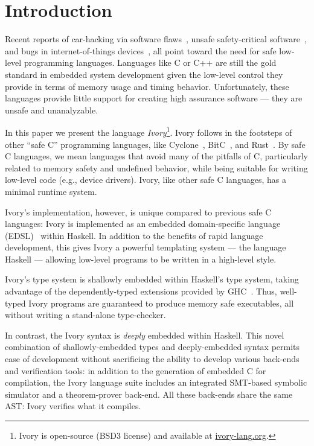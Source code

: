 \section{Introduction}
\label{sec:introduction}

Recent reports of car-hacking via software flaws~\cite{}, unsafe
safety-critical software~\cite{}, and bugs in internet-of-things
devices~\cite{}, all point toward the need for safe low-level programming
languages. Languages like C or C++ are still the gold standard in embedded
system development given the low-level control they provide in terms of memory
usage and timing behavior. Unfortunately, these languages provide
little support for creating high assurance software --- they are
unsafe and unanalyzable.

In this paper we present the language \emph{Ivory}\footnote{%
Ivory is open-source (BSD3 license) and available at \url{ivory-lang.org}.}.
Ivory follows in the
footsteps of other ``safe C'' programming languages, like
Cyclone~\cite{cyclone}, BitC~\cite{bitc}, and Rust~\cite{rust}. By safe C
languages, we mean languages that avoid many of the pitfalls of C, particularly
related to memory safety and undefined behavior, while being suitable for
writing low-level code (e.g., device drivers). Ivory, like other safe C
languages, has a minimal runtime system.

Ivory's implementation, however, is unique compared to previous safe C
languages: Ivory is implemented as an embedded domain-specific
language (EDSL)~\cite{edsl} within Haskell.  In addition to the
benefits of rapid language development, this gives Ivory a powerful
templating system --- the language Haskell --- allowing low-level
programs to be written in a high-level style.

Ivory's type system is shallowly embedded within Haskell's type
system, taking advantage of the dependently-typed extensions provided
by GHC~\cite{dephaskell}.  Thus, well-typed Ivory programs are
guaranteed to produce memory safe executables, all without writing a
stand-alone type-checker.

In contrast, the Ivory syntax is \emph{deeply} embedded within
Haskell.  This novel combination of shallowly-embedded types and
deeply-embedded syntax permits ease of development without sacrificing
the ability to develop various back-ends and verification tools: in
addition to the generation of embedded C for compilation, the Ivory
language suite includes an integrated SMT-based symbolic simulator and
a theorem-prover back-end.  All these back-ends share the same AST:
Ivory verifies what it compiles.

